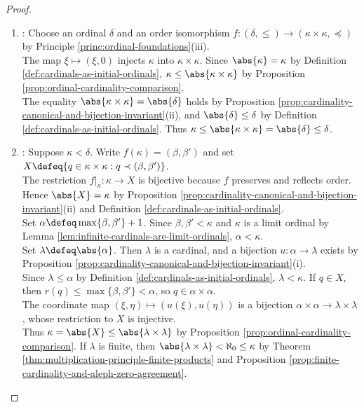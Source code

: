 \begin{theorem}
\begin{proof}
\begin{enumerate}[label=(\roman*)]
The minimum $\eta_0\defeq\min J_S$ exists by Principle \ref{princ:ordinal-foundations}(i). Then $(\xi_0,\eta_0)$ is least in $S$, so $\preceq$ is a well-order.
\item {}: Choose an ordinal $\delta$ and an order isomorphism $f:(\delta,\leq)\to(\kappa\times\kappa,\preceq)$ by Principle \ref{princ:ordinal-foundations}(iii).\\
The map $\xi\mapsto(\xi,0)$ injects $\kappa$ into $\kappa\times\kappa$. Since $\abs{\kappa}=\kappa$ by Definition \ref{def:cardinals-as-initial-ordinals}, $\kappa\leq\abs{\kappa\times\kappa}$ by Proposition \ref{prop:ordinal-cardinality-comparison}.\\
The equality $\abs{\kappa\times\kappa}=\abs{\delta}$ holds by Proposition \ref{prop:cardinality-canonical-and-bijection-invariant}(ii), and $\abs{\delta}\leq\delta$ by Definition \ref{def:cardinals-as-initial-ordinals}. Thus $\kappa\leq\abs{\kappa\times\kappa}=\abs{\delta}\leq\delta$.
\item {}: Suppose $\kappa<\delta$. Write $f(\kappa)=(\beta,\beta')$ and set $X\defeq\{q\in\kappa\times\kappa:q\prec(\beta,\beta')\}$.\\
The restriction $f|_{\kappa}:\kappa\to X$ is bijective because $f$ preserves and reflects order.\\
Hence $\abs{X}=\kappa$ by Proposition \ref{prop:cardinality-canonical-and-bijection-invariant}(ii) and Definition \ref{def:cardinals-as-initial-ordinals}.\\
Set $\alpha\defeq\max\{\beta,\beta'\}+1$. Since $\beta,\beta'<\kappa$ and $\kappa$ is a limit ordinal by Lemma \ref{lem:infinite-cardinals-are-limit-ordinals}, $\alpha<\kappa$.\\
Set $\lambda\defeq\abs{\alpha}$. Then $\lambda$ is a cardinal, and a bijection $u:\alpha\to\lambda$ exists by Proposition \ref{prop:cardinality-canonical-and-bijection-invariant}(i).\\
Since $\lambda\leq\alpha$ by Definition \ref{def:cardinals-as-initial-ordinals}, $\lambda<\kappa$. If $q\in X$, then $r(q)\leq\max\{\beta,\beta'\}<\alpha$, so $q\in\alpha\times\alpha$.\\
The coordinate map $(\xi,\eta)\mapsto(u(\xi),u(\eta))$ is a bijection $\alpha\times\alpha\to\lambda\times\lambda$, whose restriction to $X$ is injective.\\
Thus $\kappa=\abs{X}\leq\abs{\lambda\times\lambda}$ by Proposition \ref{prop:ordinal-cardinality-comparison}. If $\lambda$ is finite, then $\abs{\lambda\times\lambda}<\aleph_0\leq\kappa$ by Theorem \ref{thm:multiplication-principle-finite-products} and Proposition \ref{prop:finite-cardinality-and-aleph-zero-agreement}.\\

\end{enumerate}
\end{proof}
\end{theorem}

